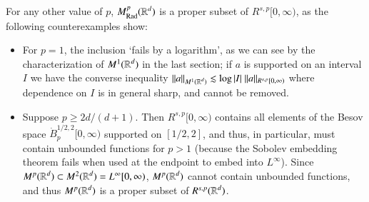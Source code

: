 For any other value of $p$, $M^p_{\text{Rad}}(\operatorname{\mathbb{R}}^d)$ is a proper subset of $R^{s,p}[0,\infty)$, as the following counterexamples show:
%
\begin{itemize}
  \item For $p = 1$, the inclusion `fails by a logarithm', as we can see by the characterization of $M^1(\operatorname{\mathbb{R}}^d)$ in the last section; if $a$ is supported on an interval $I$ we have the converse inequality $\| a \|_{M^1(\operatorname{\mathbb{R}}^d)} \lesssim \log |I|\; \| a \|_{R^{s,p}[0,\infty)}$ where dependence on $I$ is in general sharp, and cannot be removed.

  \item Suppose $p \geq 2d/(d+1)$. Then $R^{s,p}[0,\infty)$ contains all elements of the Besov space $\dot{B}^{{1/2},2}_p[0,\infty)$ supported on $[1/2,2]$, and thus, in particular, must contain unbounded functions for $p > 1$ (because the Sobolev embedding theorem fails when used at the endpoint to embed into $L^\infty$). Since $M^p(\operatorname{\mathbb{R}}^d) \subset M^2(\operatorname{\mathbb{R}}^d) = L^\infty[0,\infty)$, $M^p(\operatorname{\mathbb{R}}^d)$ cannot contain unbounded functions, and thus $M^p(\operatorname{\mathbb{R}}^d)$ is a proper subset of $R^{s,p}(\operatorname{\mathbb{R}}^d)$.









\end{itemize}
